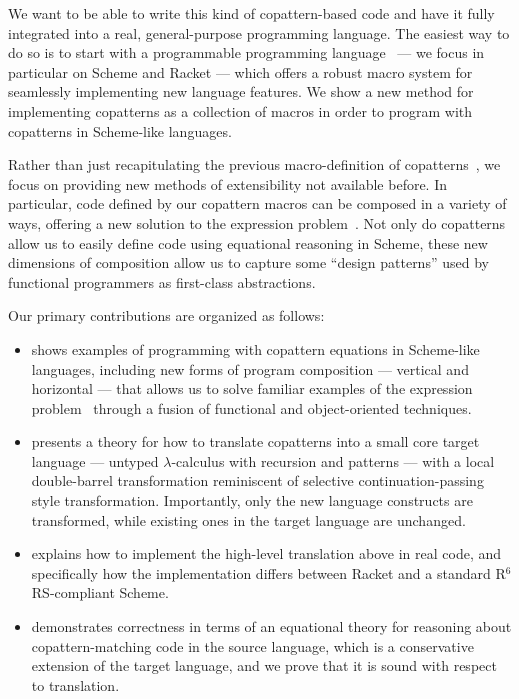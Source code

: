 We want to be able to write this kind of copattern-based code and have it fully integrated into a real, general-purpose programming language.
The easiest way to do so is to start with a programmable programming language~\cite{ProgrammablePL} --- we focus in particular on Scheme and Racket --- which offers a robust macro system for seamlessly implementing new language features.
We show a new method for implementing copatterns as a collection of macros in order to program with copatterns in Scheme-like languages.

Rather than just recapitulating the previous macro-definition of copatterns~\cite{LaforgueR17}, we focus on providing new methods of extensibility not available before.
In particular, code defined by our copattern macros can be composed in a variety of ways,
offering a new solution to the expression problem~\cite{ExpressionProblem}.
Not only do copatterns allow us to easily define code using equational reasoning in Scheme, these new dimensions of composition allow us to capture some ``design patterns'' used by functional programmers as first-class abstractions.

Our primary contributions are organized as follows:
\begin{itemize}
\item {} shows examples of programming with copattern equations in Scheme-like languages, including new forms of program composition --- vertical and horizontal --- that allows us to solve familiar examples of the expression problem~\cite{ExpressionProblem} through a fusion of functional and object-oriented techniques.
\item {} presents a theory for how to translate copatterns into a small core target language --- untyped $\lambda$-calculus with recursion and patterns --- with a local double-barrel transformation reminiscent of selective continuation-passing style transformation.
  Importantly, only the new language constructs are transformed, while existing ones in the target language are unchanged.
\item {} explains how to implement the high-level translation above in real code, and specifically how the implementation differs between Racket and a standard R${}^6$RS-compliant Scheme.
\item {} demonstrates correctness in terms of an equational theory for reasoning about copattern-matching code in the source language, which is a conservative extension of the target language, and we prove that it is sound with respect to translation.
\end{itemize} 


